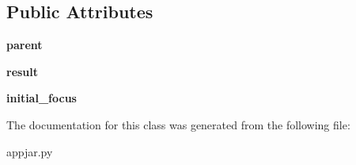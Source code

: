 \subsection*{Public Attributes}
\begin{DoxyCompactItemize}
\item 
\mbox{\label{class_python_01_g_u_i_1_1appjar_1_1_dialog_a24dda2938d28b9fb25052fa521a0a704}} 
{\bfseries parent}
\item 
\mbox{\label{class_python_01_g_u_i_1_1appjar_1_1_dialog_af2b88685686c50b4f8d88d50fa8ef912}} 
{\bfseries result}
\item 
\mbox{\label{class_python_01_g_u_i_1_1appjar_1_1_dialog_ac86dd00fe06b2638093ec6bdd2ad5c5a}} 
{\bfseries initial\+\_\+focus}
\end{DoxyCompactItemize}


The documentation for this class was generated from the following file\+:\begin{DoxyCompactItemize}
\item 
appjar.\+py\end{DoxyCompactItemize}
